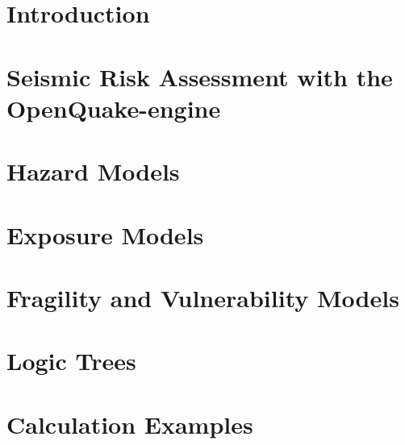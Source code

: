 
\chapter{Introduction}
   \label{chap:introduction}
	
   \cleardoublepage

\chapter{Seismic Risk Assessment with the OpenQuake-engine}
   \label{chap:oq-risk}
	
   \cleardoublepage

\chapter{Hazard Models}
	\label{chap:hazard}
	
   \cleardoublepage

\chapter{Exposure Models}
   \label{chap:exposure}
   
   \cleardoublepage

\chapter{Fragility and Vulnerability Models}
	\label{chap:vulnerability}
	
   \cleardoublepage

\chapter{Logic Trees}
	\label{chap:logic-trees}
	
   \cleardoublepage

\chapter{Calculation Examples}
   \label{chap:examples}
   
   \cleardoublepage

